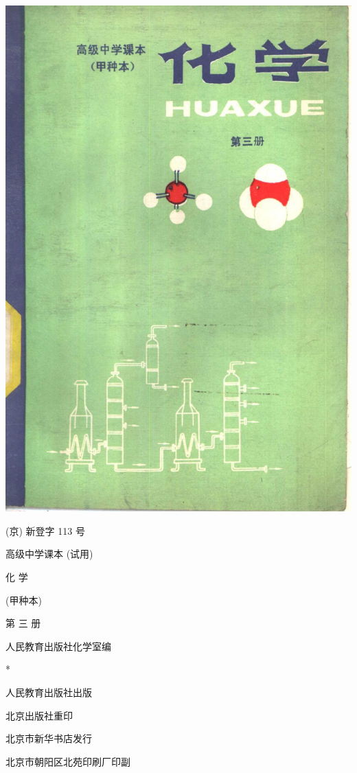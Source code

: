 \documentclass[10pt]{article}
\begin{document}
\begin{center}
\includegraphics[max width=1.0\textwidth]{images/01912d16-be99-77bb-9535-4f3ed8d9946f_1_396725.jpg}
\end{center}

(京) 新登字 113 号

高级中学课本 (试用)

化 学

(甲种本)

第 三 册

人民教育出版社化学室编

*

人民教育出版社出版

北京出版社重印

北京市新华书店发行

北京市朝阳区北苑印刷厂印副
\end{document}
